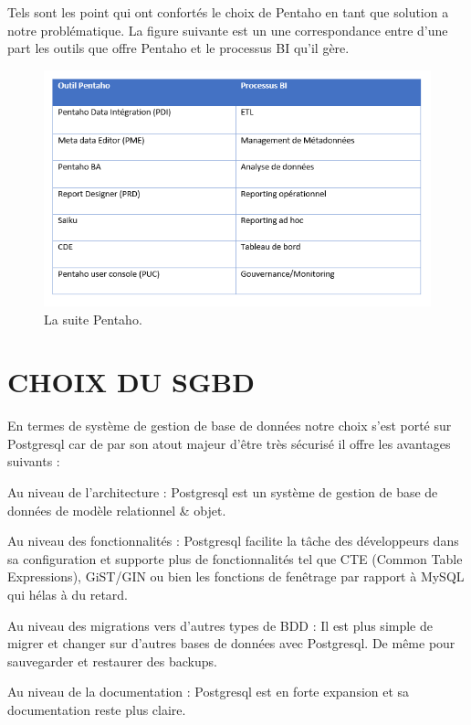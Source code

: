 Tels sont les point qui ont confortés le choix de Pentaho en tant que solution a notre problématique. La figure suivante est un une correspondance entre d’une part les outils que offre Pentaho et le processus BI qu’il gère.

\begin{figure}[!htbp]
	\begin{center}
		\includegraphics[scale=0.95]{images/tab_pentaho_tools.png}
		\caption{La suite Pentaho.}
		\label{use_bi_tools}
	\end{center}
\end{figure}


\cleardoublepage
\section{CHOIX DU SGBD}

En termes de système de gestion de base de données notre choix s’est porté sur Postgresql car de par son atout majeur d’être très sécurisé il offre les avantages suivants :  
\begin{list}{•}{ }
   \item Au niveau de l’architecture : Postgresql est un système de gestion de base de données de modèle relationnel \& objet.
   \item Au niveau des fonctionnalités : Postgresql facilite la tâche des développeurs dans sa configuration et supporte plus de fonctionnalités tel que CTE (Common Table Expressions), GiST/GIN ou bien les fonctions de fenêtrage par rapport à MySQL qui hélas à du retard.
   \item Au niveau des migrations vers d’autres types de BDD : Il est plus simple de migrer et changer sur d’autres bases de données avec Postgresql. De même pour sauvegarder et restaurer des backups.
 \item Au niveau de la documentation : Postgresql est en forte expansion et sa documentation reste plus claire.
\end{list}

